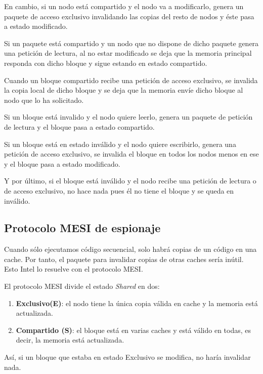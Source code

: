 \documentclass[10pt,a4paper,spanish]{report}
\begin{document}
En cambio, si un nodo está compartido y el nodo va a modificarlo, genera un paquete de acceso exclusivo invalidando las copias del resto de nodos y éste pasa a estado modificado.

Si un paquete está compartido y un nodo que no dispone de dicho paquete genera una petición de lectura, al no estar modificado se deja que la memoria principal responda con dicho bloque y sigue estando en estado compartido.

Cuando un bloque compartido recibe una petición de acceso exclusivo, se invalida la copia local de dicho bloque y se deja que la memoria envíe dicho bloque al nodo que lo ha solicitado.

Si un bloque está invalido y el nodo quiere leerlo, genera un paquete de petición de lectura y el bloque pasa a estado compartido.

Si un bloque está en estado inválido y el nodo quiere escribirlo, genera una petición de acceso exclusivo, se invalida el bloque en todos los nodos menos en ese y el bloque pasa a estado modificado.

Y por último, si el bloque está inválido y el nodo recibe una petición de lectura o de acceso exclusivo, no hace nada pues él no tiene el bloque y se queda en inválido.

\newpage
\textcolor[rgb]{0.2,0.4,0.8}{\subsection{Protocolo MESI de espionaje}}
Cuando sólo ejecutamos código secuencial,  solo habrá copias de un código en una cache. Por tanto, el paquete para invalidar copias de otras caches sería inútil. Esto Intel lo resuelve con el protocolo MESI.

El protocolo MESI divide el estado \textcolor[rgb]{0.2,0.4,0.8}{\textit{Shared}} en dos:
\begin{enumerate}[\color{azul}{\bf $\heartsuit$}]
    \item \textcolor[rgb]{0.2,0.4,0.8}{\textbf{Exclusivo(E)}}: el nodo tiene la única copia válida en cache y la memoria está actualizada.
    \item \textcolor[rgb]{0.2,0.4,0.8}{\textbf{Compartido (S)}}: el bloque está en varias caches y está válido en todas, es decir, la memoria está actualizada.
\end{enumerate}

Así, si un bloque que estaba en estado Exclusivo se modifica, no haría invalidar nada.
\end{document}
